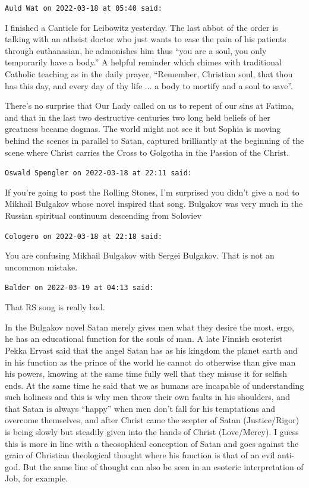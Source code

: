\begin{footnotesize}
\begin{sffamily}
\texttt{Auld Wat on 2022-03-18 at 05:40 said:}

I finished a Canticle for Leibowitz yesterday. The last abbot of the order is talking with an atheist doctor who just wants to ease the pain of his patients through euthanasian, he admonishes him thus ``you are a soul, you only temporarily have a body.'' A helpful reminder which chimes with traditional Catholic teaching as in the daily prayer, ``Remember, Christian soul, that thou has this day, and every day of thy life ... a body to mortify and a soul to save''.

There's no surprise that Our Lady called on us to repent of our sins at Fatima, and that in the last two destructive centuries two long held beliefs of her greatness became dogmas. The world might not see it but Sophia is moving behind the scenes in parallel to Satan, captured brilliantly at the beginning of the scene where Christ carries the Cross to Golgotha in the Passion of the Christ.

\hfill

\texttt{Oswald Spengler on 2022-03-18 at 22:11 said:}

If you're going to post the Rolling Stones, I'm surprised you didn't give a nod to Mikhail Bulgakov whose novel inspired that song. Bulgakov was very much in the Russian spiritual continuum descending from Soloviev

\hfill

\texttt{Cologero on 2022-03-18 at 22:18 said:}

You are confusing Mikhail Bulgakov with Sergei Bulgakov. That is not an uncommon mistake.

\hfill

\texttt{Balder on 2022-03-19 at 04:13 said:}

That RS song is really bad.

In the Bulgakov novel Satan merely gives men what they desire the most, ergo, he has an educational function for the souls of man. A late Finnish esoterist Pekka Ervast said that the angel Satan has as his kingdom the planet earth and in his function as the prince of the world he cannot do otherwise than give man his powers, knowing at the same time fully well that they misuse it for selfish ends. At the same time he said that we as humans are incapable of understanding such holiness and this is why men throw their own faults in his shoulders, and that Satan is always ``happy'' when men don't fall for his temptations and overcome themselves, and after Christ came the scepter of Satan (Justice/Rigor) is being slowly but steadily given into the hands of Christ (Love/Mercy). I guess this is more in line with a theosophical conception of Satan and goes against the grain of Christian theological thought where his function is that of an evil anti-god. But the same line of thought can also be seen in an esoteric interpretation of Job, for example.


\end{sffamily}
\end{footnotesize}
